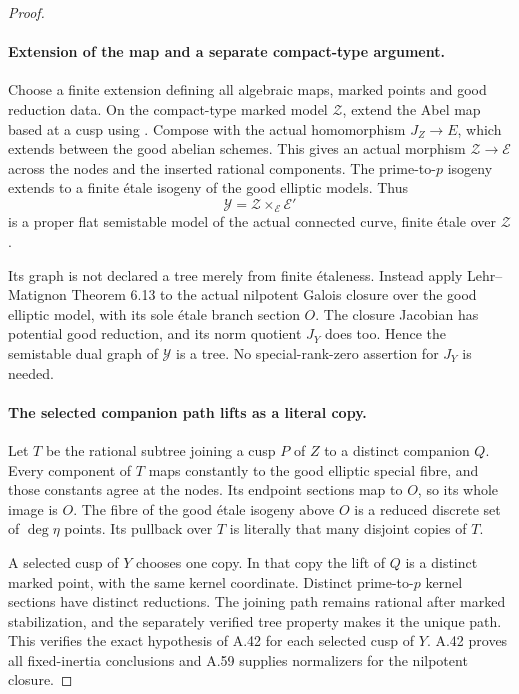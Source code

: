 \begin{proof}
\paragraph{Extension of the map and a separate compact-type argument.}
Choose a finite extension defining all algebraic maps,
marked points and good reduction data. On the compact-type
marked model \(\mathcal Z\), extend the Abel map based
at a cusp using \cite[Theorem 1.1 and Proposition 3.2]{fghDupuyRabinoff}.
Compose with the actual homomorphism \(J_Z\to E\),
which extends between the good abelian schemes. This gives
an actual morphism \(\mathcal Z\to\mathcal E\)
across the nodes and the inserted rational components.
The prime-to-\(p\) isogeny extends to a finite \'etale
isogeny of the good elliptic models. Thus
\[
 \mathcal Y=\mathcal Z\times_{\mathcal E}\mathcal E'
                                                               \tag{A.79.4}
\]
is a proper flat semistable model of the actual connected
curve, finite \'etale over \(\mathcal Z\).

Its graph is not declared a tree merely from finite
\'{e}taleness. Instead apply Lehr--Matignon Theorem 6.13
\cite[Theorem 6.13]{fghLehrMatignon2005} to the actual nilpotent Galois closure over the good
elliptic model, with its sole \'etale branch section
\(O\). The closure Jacobian has potential good reduction,
and its norm quotient \(J_Y\) does too. Hence the
semistable dual graph of \(\mathcal Y\) is a tree.
No special-rank-zero assertion for \(J_Y\) is needed.

\paragraph{The selected companion path lifts as a literal copy.}
Let \(T\) be the rational subtree joining a cusp
\(P\) of \(Z\) to a distinct companion \(Q\).
Every component of \(T\) maps constantly to the good
elliptic special fibre, and those constants agree at the
nodes. Its endpoint sections map to \(O\), so its
whole image is \(O\). The fibre of the good \'etale
isogeny above \(O\) is a reduced discrete set of
\(\deg\eta\) points. Its pullback over \(T\) is
literally that many disjoint copies of \(T\).

A selected cusp of \(Y\) chooses one copy. In that
copy the lift of \(Q\) is a distinct marked point,
with the same kernel coordinate. Distinct prime-to-\(p\)
kernel sections have distinct reductions. The joining
path remains rational after marked stabilization, and
the separately verified tree property makes it the
unique path. This verifies the exact hypothesis of A.42
for each selected cusp of \(Y\). A.42 proves all
fixed-inertia conclusions and A.59 supplies normalizers
for the nilpotent closure.


\end{proof}
